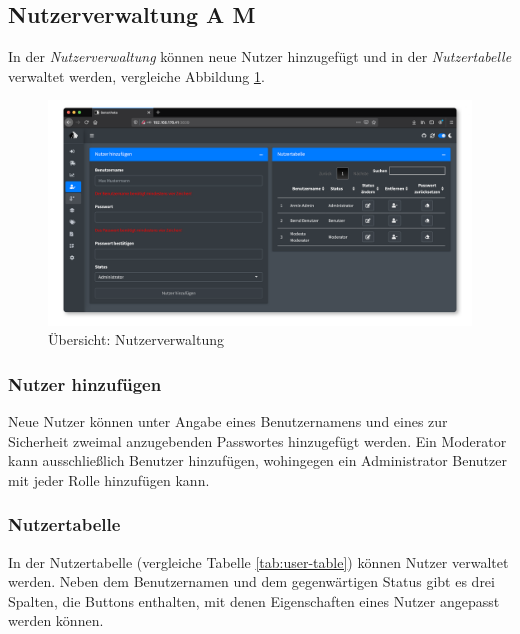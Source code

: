 \documentclass[
]{article}
\begin{document}
\hypertarget{user-management}{%
\subsection{Nutzerverwaltung A M}\label{user-management}}

In der \emph{Nutzerverwaltung} können neue Nutzer hinzugefügt und in der \emph{Nutzertabelle} verwaltet werden, vergleiche Abbildung \ref{fig:user-management-overview}.

\begin{figure}
\centering
\includegraphics{./img/user_management_overview.png}
\caption{\label{fig:user-management-overview}Übersicht: Nutzerverwaltung}
\end{figure}

\hypertarget{nutzer-hinzufuxfcgen}{%
\subsubsection{Nutzer hinzufügen}\label{nutzer-hinzufuxfcgen}}

Neue Nutzer können unter Angabe eines Benutzernamens und eines zur Sicherheit zweimal anzugebenden Passwortes hinzugefügt werden. Ein Moderator kann ausschließlich Benutzer hinzufügen, wohingegen ein Administrator Benutzer mit jeder Rolle hinzufügen kann.

\hypertarget{nutzertabelle}{%
\subsubsection{Nutzertabelle}\label{nutzertabelle}}

In der Nutzertabelle (vergleiche Tabelle \ref{tab:user-table}) können Nutzer verwaltet werden. Neben dem Benutzernamen und dem gegenwärtigen Status gibt es drei Spalten, die Buttons enthalten, mit denen Eigenschaften eines Nutzer angepasst werden können.
\end{document}
